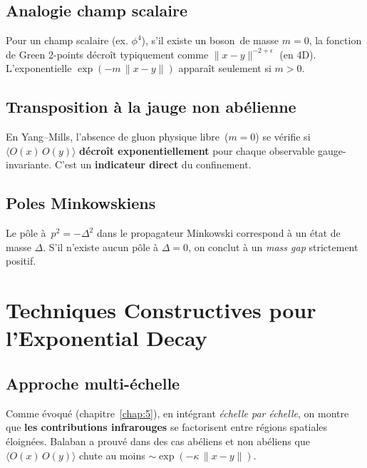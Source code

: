 \subsection*{Analogie champ scalaire}
Pour un champ scalaire (ex. \(\phi^4\)), s’il existe un \og boson\fg\ de masse \(m=0\), la fonction de Green 2-points décroît typiquement comme \(\|x-y\|^{-2+\epsilon}\) (en 4D). L’exponentielle \(\exp(-m\,\|x-y\|)\) apparaît seulement si \(m>0\).

\subsection*{Transposition à la jauge non abélienne}
En Yang--Mills, l’absence de \og gluon physique libre\fg\ (\(m=0\)) se vérifie si \(\langle O(x)\,O(y)\rangle\) \textbf{décroît exponentiellement} pour chaque observable gauge-invariante. C’est un \textbf{indicateur direct} du confinement.

\subsection*{Poles Minkowskiens}
Le pôle à \(\,p^2 = -\Delta^2\) dans le propagateur Minkowski correspond à un \og état de masse \(\Delta\). S’il n’existe aucun pôle à \(\Delta=0\), on conclut à un \emph{mass gap} strictement positif.

\vspace{1em}

\section{Techniques Constructives pour l’Exponential Decay}
\label{sec:9.3}

\subsection*{Approche multi-échelle}
Comme évoqué (chapitre~\ref{chap:5}), en intégrant \emph{échelle par échelle}, on montre que \textbf{les contributions infrarouges} se factorisent entre régions spatiales éloignées. Balaban \cite{Balaban1982-1,Balaban1982-2} a prouvé dans des cas abéliens et non abéliens que \(\langle O(x)\,O(y)\rangle\) chute au moins \(\sim \exp(-\kappa\,\|x-y\|)\).

